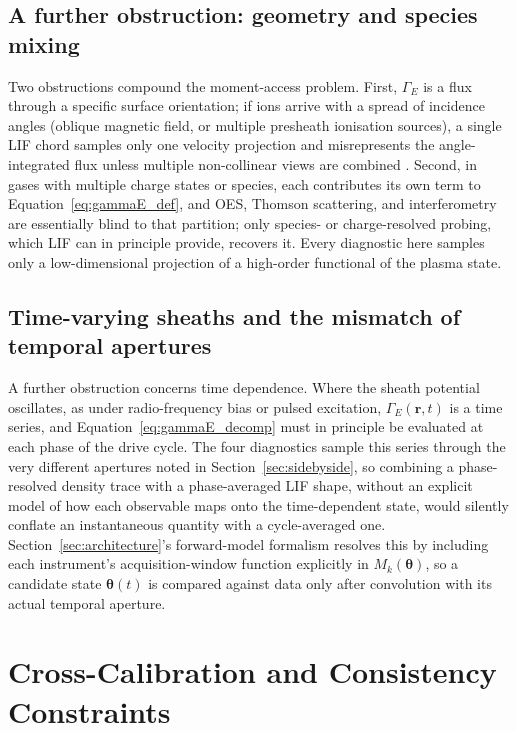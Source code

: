 \subsection{A further obstruction: geometry and species mixing}

Two obstructions compound the moment-access problem. First, $\Gamma_{E}$ is a flux through a specific surface orientation; if ions arrive with a spread of incidence angles (oblique magnetic field, or multiple presheath ionisation sources), a single LIF chord samples only one velocity projection and misrepresents the angle-integrated flux unless multiple non-collinear views are combined \cite{ref0328}. Second, in gases with multiple charge states or species, each contributes its own term to Equation~\eqref{eq:gammaE_def}, and OES, Thomson scattering, and interferometry are essentially blind to that partition; only species- or charge-resolved probing, which LIF can in principle provide, recovers it. Every diagnostic here samples only a low-dimensional projection of a high-order functional of the plasma state.

\subsection{Time-varying sheaths and the mismatch of temporal apertures}

A further obstruction concerns time dependence. Where the sheath potential oscillates, as under radio-frequency bias or pulsed excitation, $\Gamma_{E}(\mathbf{r},t)$ is a time series, and Equation~\eqref{eq:gammaE_decomp} must in principle be evaluated at each phase of the drive cycle. The four diagnostics sample this series through the very different apertures noted in Section~\ref{sec:sidebyside}, so combining a phase-resolved density trace with a phase-averaged LIF shape, without an explicit model of how each observable maps onto the time-dependent state, would silently conflate an instantaneous quantity with a cycle-averaged one. Section~\ref{sec:architecture}'s forward-model formalism resolves this by including each instrument's acquisition-window function explicitly in $M_{k}(\boldsymbol{\theta})$, so a candidate state $\boldsymbol{\theta}(t)$ is compared against data only after convolution with its actual temporal aperture.

\section{Cross-Calibration and Consistency Constraints}
\label{sec:crosscal}

